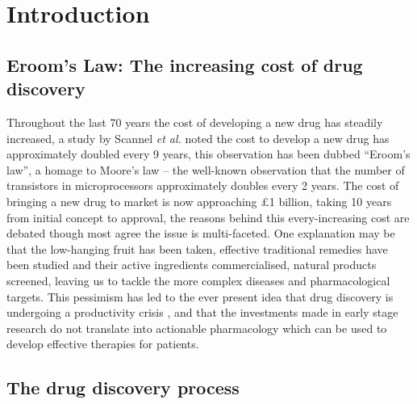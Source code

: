 \documentclass[a4paper,11pt,twoside,openright]{scrbook}
\begin{document}
\chapter{Introduction} \label{chapter:intro}


\section{Eroom's Law: The increasing cost of drug discovery}
Throughout the last 70 years the cost of developing a new drug has steadily increased, a study by Scannel \textit{et al.} noted the cost to develop a new drug has approximately doubled every 9 years, \cite{Scannell2012} this observation has been dubbed ``Eroom's law'', a homage to Moore's law -- the well-known observation that the number of transistors in microprocessors approximately doubles every 2 years.
The cost of bringing a new drug to market is now approaching £1 billion, taking 10 years from initial concept to approval, the reasons behind this every-increasing cost are debated though most agree the issue is multi-faceted.
One explanation may be that the low-hanging fruit has been taken, effective traditional remedies have been studied and their active ingredients commercialised, natural products screened, leaving us to tackle the more complex diseases and pharmacological targets.  
This pessimism has led to the ever present idea that drug discovery is undergoing a productivity crisis \cite{citation_needed}, and that the investments made in early stage research do not translate into actionable pharmacology which can be used to develop effective therapies for patients.


\section{The drug discovery process}
\end{document}
